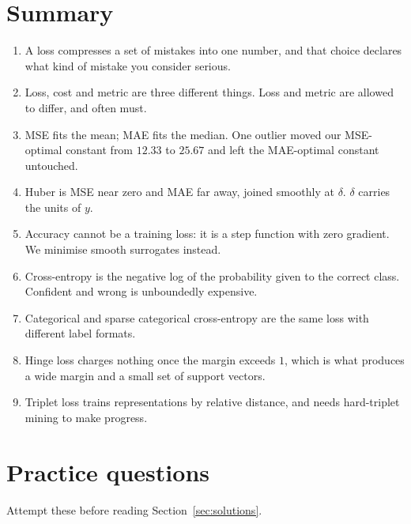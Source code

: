 \documentclass[11pt]{article}
\begin{document}
\section{Summary}

\begin{enumerate}[leftmargin=*]
  \item A loss compresses a set of mistakes into one number, and that choice
    declares what kind of mistake you consider serious.
  \item Loss, cost and metric are three different things. Loss and metric are
    allowed to differ, and often must.
  \item MSE fits the mean; MAE fits the median. One outlier moved our
    MSE-optimal constant from $12.33$ to $25.67$ and left the MAE-optimal
    constant untouched.
  \item Huber is MSE near zero and MAE far away, joined smoothly at $\delta$.
    $\delta$ carries the units of $y$.
  \item Accuracy cannot be a training loss: it is a step function with zero
    gradient. We minimise smooth surrogates instead.
  \item Cross-entropy is the negative log of the probability given to the
    correct class. Confident and wrong is unboundedly expensive.
  \item Categorical and sparse categorical cross-entropy are the same loss with
    different label formats.
  \item Hinge loss charges nothing once the margin exceeds $1$, which is what
    produces a wide margin and a small set of support vectors.
  \item Triplet loss trains representations by relative distance, and needs
    hard-triplet mining to make progress.
\end{enumerate}

\newpage
\section{Practice questions}

Attempt these before reading Section~\ref{sec:solutions}.
\end{document}
